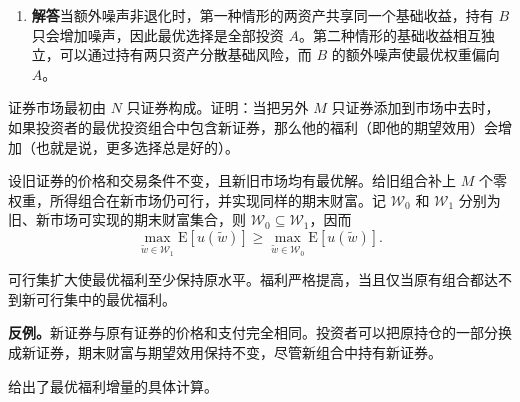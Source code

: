 \begin{solution}[show-qed=false,blank-type=manual,blank-vsep=11\baselineskip]
\begin{enumerate}[label=(\alph*)]
 固定 $S$ 后，记 $f(e)=u'(1+S/2+e/2)$，并取噪声的独立同分布副本 $\tilde e'$。将两份独立抽样的差相乘，可以写出
 \[
  2\operatorname{Cov}(f(\tilde e),\tilde e\mid S)
  =\mathrm E[(f(\tilde e)-f(\tilde e'))(\tilde e-\tilde e')\mid S].
 \]
 由于边际效用严格递减，两个差的符号相反。若 $\tilde e$ 非退化，两份抽样以正概率取不同值，因此条件协方差严格为负，得 $V'(1/2)>0$。同理，在 $a=1$ 处，$\tilde w=1+\tilde x$，且 $\mathrm E[\tilde y+\tilde e\mid\tilde x]=\mathrm E[\tilde x]$。若 $\tilde x$ 非退化，则
 \[
 V'(1)=\operatorname{Cov}(u'(1+\tilde x),\tilde x)<0.
 \]

 若 $[0,1]$ 内的配置均可行，且 $\tilde x$ 与 $\tilde e$ 都非退化，则 $V''<0$，所以 $V'$ 严格递减。由于 $V'(1/2)>0>V'(1)$，$V'$ 在 $(1/2,1)$ 内恰有一个零点，即唯一的最优权重 $a^*$。

 若 $\tilde x$ 为常数而 $\tilde e$ 非退化，全部投资 $A$ 最优，仍有 $a^*>1/2$。若 $\tilde e=0$ 而 $\tilde x$ 非退化，交换对称性给出 $a^*=1/2$；若两者均退化，所有可行权重等效。因此题目的严格比较需要额外噪声非退化。

 \item \textbf{解答}\quad 当额外噪声非退化时，第一种情形的两资产共享同一个基础收益，持有 $B$ 只会增加噪声，因此最优选择是全部投资 $A$。第二种情形的基础收益相互独立，可以通过持有两只资产分散基础风险，而 $B$ 的额外噪声使最优权重偏向 $A$。
\end{enumerate}
\end{solution}

\begin{problem}
 证券市场最初由 $N$ 只证券构成。证明：当把另外 $M$ 只证券添加到市场中去时，如果投资者的最优投资组合中包含新证券，那么他的福利（即他的期望效用）会增加（也就是说，更多选择总是好的）。
\end{problem}
\begin{solution}[label-content={证明},blank-type=manual,blank-vsep=6\baselineskip]
设旧证券的价格和交易条件不变，且新旧市场均有最优解。给旧组合补上 $M$ 个零权重，所得组合在新市场仍可行，并实现同样的期末财富。记 $\mathcal W_0$ 和 $\mathcal W_1$ 分别为旧、新市场可实现的期末财富集合，则 $\mathcal W_0\subseteq\mathcal W_1$，因而
\[
 \max_{\tilde w\in\mathcal W_1}\mathrm E[u(\tilde w)]
 \ge\max_{\tilde w\in\mathcal W_0}\mathrm E[u(\tilde w)].
\]

可行集扩大使最优福利至少保持原水平。福利严格提高，当且仅当原有组合都达不到新可行集中的最优福利。

\textbf{反例。}新证券与原有证券的价格和支付完全相同。投资者可以把原持仓的一部分换成新证券，期末财富与期望效用保持不变，尽管新组合中持有新证券。

 给出了最优福利增量的具体计算。
\end{solution}

